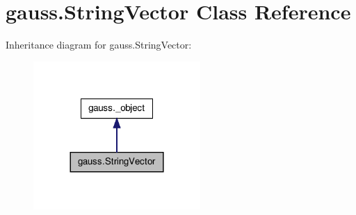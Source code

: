 \hypertarget{classgauss_1_1_string_vector}{\section{gauss.\-String\-Vector Class Reference}
\label{classgauss_1_1_string_vector}
}


Inheritance diagram for gauss.\-String\-Vector\-:\nopagebreak
\begin{figure}[H]
\begin{center}
\leavevmode
\includegraphics[width=180pt]{classgauss_1_1_string_vector__inherit__graph}
\end{center}
\end{figure}
